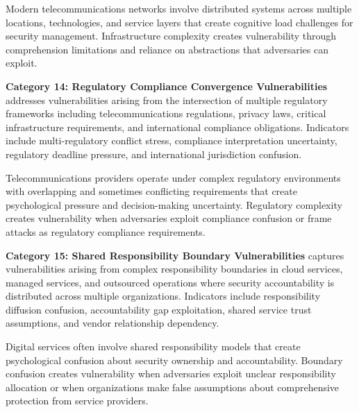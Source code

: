 \documentclass[10pt, twocolumn]{article}
\begin{document}
Modern telecommunications networks involve distributed systems across multiple locations, technologies, and service layers that create cognitive load challenges for security management. Infrastructure complexity creates vulnerability through comprehension limitations and reliance on abstractions that adversaries can exploit.

\textbf{Category 14: Regulatory Compliance Convergence Vulnerabilities} addresses vulnerabilities arising from the intersection of multiple regulatory frameworks including telecommunications regulations, privacy laws, critical infrastructure requirements, and international compliance obligations. Indicators include multi-regulatory conflict stress, compliance interpretation uncertainty, regulatory deadline pressure, and international jurisdiction confusion.

Telecommunications providers operate under complex regulatory environments with overlapping and sometimes conflicting requirements that create psychological pressure and decision-making uncertainty. Regulatory complexity creates vulnerability when adversaries exploit compliance confusion or frame attacks as regulatory compliance requirements.

\textbf{Category 15: Shared Responsibility Boundary Vulnerabilities} captures vulnerabilities arising from complex responsibility boundaries in cloud services, managed services, and outsourced operations where security accountability is distributed across multiple organizations. Indicators include responsibility diffusion confusion, accountability gap exploitation, shared service trust assumptions, and vendor relationship dependency.

Digital services often involve shared responsibility models that create psychological confusion about security ownership and accountability. Boundary confusion creates vulnerability when adversaries exploit unclear responsibility allocation or when organizations make false assumptions about comprehensive protection from service providers.
\end{document}
